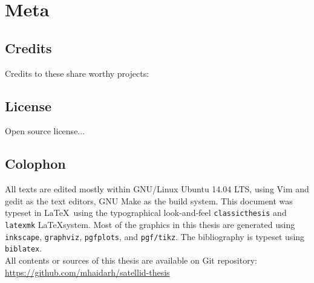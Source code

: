 \chapter*{Meta}
\label{chap:meta}

\section*{Credits}
\label{sec:credits}

Credits to these share worthy projects:

\section*{License}
\label{sec:license}

Open source license...

\section*{Colophon}
\label{sec:colophon}

All texts are edited mostly within GNU/Linux Ubuntu 14.04 LTS, using Vim and gedit as the text editors, GNU Make as the build system.
This document was typeset in \LaTeX~using the typographical look-and-feel \texttt{classicthesis} and \verb|latexmk| \LaTeX system.
Most of the graphics in this thesis are generated using \texttt{inkscape}, \texttt{graphviz}, \texttt{pgfplots}, and \texttt{pgf/tikz}.
The bibliography is typeset using \texttt{biblatex}.
\\
All contents or sources of this thesis are available on Git repository:\\
\url{https://github.com/mhaidarh/satellid-thesis}

